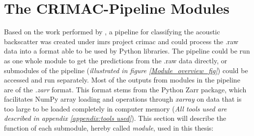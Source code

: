         
        
        
        \section{The CRIMAC-Pipeline Modules}\label{CRIMAC-pipeline}
        Based on the work performed by \citeauthor{brautaset2020acoustic}\cite{brautaset2020acoustic}, a pipeline for classifying the acoustic backscatter was created under \gls{imr}s project \gls{crimac}\cite{crimac_pipeline} and could process the .raw data into a format able to be used by Python libraries. The pipeline could be run as one whole module to get the predictions from the .raw data directly, or submodules of the pipeline (\textit{illustrated in figure \ref{Module_overview_fig}}) could be accessed and run separately. Most of the outputs from modules in the pipeline are of the \textit{.zarr} format. This format stems from the Python Zarr package, which facilitates NumPy array loading and operations through \textit{xarray} on data that is too large to be loaded completely in computer memory (\textit{All tools used are described in appendix \ref{appendix:tools used}}). This section will describe the function of each submodule, hereby called \textit{module}, used in this thesis:
   

        

